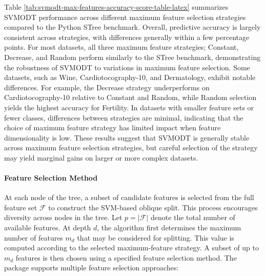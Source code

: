 Table \ref{tab:svmodt-max-features-accuracy-score-table-latex} summarizes SVMODT performance across different maximum feature selection strategies compared to the Python STree benchmark. Overall, predictive accuracy is largely consistent across strategies, with differences generally within a few percentage points. For most datasets, all three maximum feature strategies; Constant, Decrease, and Random perform similarly to the STree benchmark, demonstrating the robustness of SVMODT to variations in maximum feature selection. Some datasets, such as Wine, Cardiotocography-10, and Dermatology, exhibit notable differences. For example, the Decrease strategy underperforms on Cardiotocography-10 relative to Constant and Random, while Random selection yields the highest accuracy for Fertility. In datasets with smaller feature sets or fewer classes, differences between strategies are minimal, indicating that the choice of maximum feature strategy has limited impact when feature dimensionality is low. These results suggest that SVMODT is generally stable across maximum feature selection strategies, but careful selection of the strategy may yield marginal gains on larger or more complex datasets.

\paragraph{Feature Selection Method}\label{feature-selection-method}

At each node of the tree, a subset of candidate features is selected from the full feature set \(\mathcal{F}\) to construct the SVM-based oblique split. This process encourages diversity across nodes in the tree. Let \(p = |\mathcal{F}|\) denote the total number of available features. At depth \(d\), the algorithm first determines the maximum number of features \(m_d\) that may be considered for splitting. This value is computed according to the selected maximum-feature strategy. A subset of up to \(m_d\) features is then chosen using a specified feature selection method. The package supports multiple feature selection approaches:

